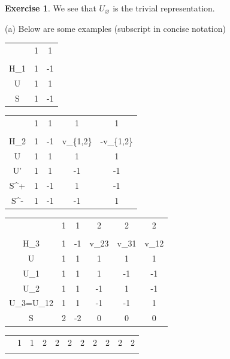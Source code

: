 \documentclass[12pt, letterpaper]{article}
\renewcommand{\emptyset}{\varnothing}
\theoremstyle{definition}
\theoremstyle{remark}
\theoremstyle{definition}
\newtheorem{exe}{Exercise}[section]
\theoremstyle{plain}
\numberwithin{equation}{section}
\begin{document}
\begin{exe}
		We see that $U_{\emptyset}$ is the trivial representation.
		
		(a)
		Below are some examples (subscript in concise notation)
		\begin{center}
			\begin{tabular}{C | C C }
				& 1 & 1 \\
				\\
				H_1& 1 & -1 \\
				\hline
				U & 1 & 1 \\
				S & 1 & -1\\ 
			\end{tabular}
		\end{center}
		\begin{center}
			\begin{tabular}{C | C C C C}
				& 1 & 1 & 1 & 1 \\
				\\
				H_{2}& 1 & -1 & v_{\{1,2\}} & -v_{\{1,2\}} \\
				\hline
				U & 1 & 1 &1&1 \\
				U' & 1 & 1 &-1&-1 \\
				S^+ & 1 & -1 & 1 & -1\\ 
				S^- & 1 & -1 & -1 & 1\\ 				
			\end{tabular}
		\end{center}
		\begin{center}\label{charTableH3}
			\begin{tabular}{C | C C C C C }
				& 1 & 1 & 2 & 2 & 2 \\
				\\
				H_3& 1 & -1 & v_{23}  & v_{31} &  v_{12} \\
				\hline
				U & 1 & 1 & 1 & 1 & 1 \\
				U_1 & 1 & 1 & 1 &-1&-1\\
				U_2 & 1 & 1 & -1&1&-1\\
				U_3=U_{12} & 1 & 1 & -1&-1&1\\
				S & 2 & -2 & 0 & 0&0\\ 
			\end{tabular}
		\end{center}
		\begin{center}
			\begin{tabular}{C | C C C C C C C C C C }
				& 1 & 1 & 2 & 2 & 2 &2&2&2&2&2\\
				\\

\end{tabular}
\end{center}
\end{exe}
\end{document}
